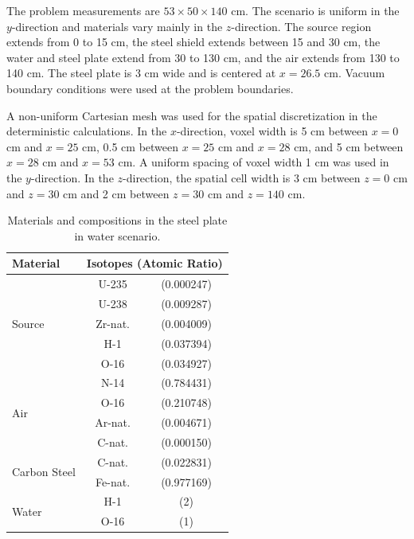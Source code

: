 \documentclass{article} %
\begin{document}
The problem measurements are $53\times50\times140$ cm. The scenario is uniform 
in the $y$-direction and materials vary mainly in the $z$-direction. The source
region extends from 0 to 15 cm, the steel shield extends between 15 and 30 cm, 
the water and steel plate extend from 30 to 130 cm, and the air extends from 
130 to 140 cm. The steel plate is 3 cm wide and is centered at $x = 26.5$ cm. 
Vacuum boundary conditions were used at the problem boundaries.

A non-uniform Cartesian mesh was used for the spatial discretization in the 
deterministic calculations. In the $x$-direction, voxel width is 5 cm between
$x = 0$ cm and $x = 25$ cm, 0.5 cm between $x = 25$ cm and $x = 28$ cm, and 5 
cm between $x = 28$ cm and $x = 53$ cm. A uniform spacing of voxel width 1 cm 
was used in the $y$-direction. In the $z$-direction, the spatial cell width is
3 cm between $z = 0$ cm and $z = 30$ cm and 2 cm between $z = 30$ cm and 
$z = 140$ cm.

\begin{table}[!htb]
\centering
\caption{Materials and compositions in the steel plate in water scenario.}
\label{steel-mat}
\begin{tabular}{l|cc}
\textbf{Material} & \multicolumn{2}{c}{\textbf{Isotopes (Atomic Ratio)}} \\ \hline
\multirow{5}{*}{Source}   & U-235   & (0.000247) \\
                          & U-238   & (0.009287) \\
                          & Zr-nat. & (0.004009) \\
                          & H-1     & (0.037394) \\
                          & O-16    & (0.034927) \\ \hline
\multirow{4}{*}{Air}      & N-14    & (0.784431) \\
                          & O-16    & (0.210748) \\
                          & Ar-nat. & (0.004671) \\
                          & C-nat.  & (0.000150) \\ \hline
\multirow{2}{*}{Carbon Steel} & C-nat.  & (0.022831) \\
                              & Fe-nat. & (0.977169) \\ \hline
\multirow{2}{*}{Water}        & H-1     & (2)        \\
                              & O-16    & (1)        \\
\end{tabular}
\end{table}
\end{document}
